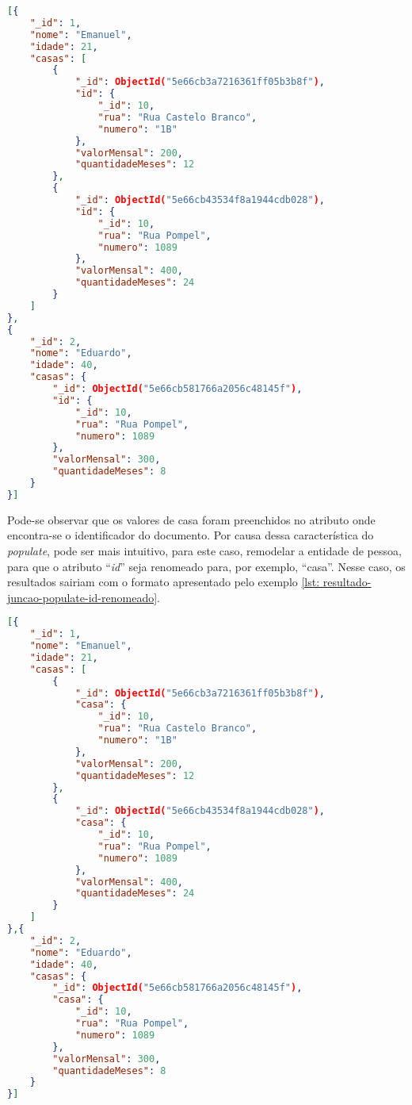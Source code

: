 \begin{lstlisting}[language=json, caption={Resultado da Junção de Documentos Com o \textit{Populate}\label{lst: resultado-juncao-populate}}]
[{
    "_id": 1,
    "nome": "Emanuel",
    "idade": 21,
    "casas": [
        {
            "_id": ObjectId("5e66cb3a7216361ff05b3b8f"),
            "id": {
                "_id": 10,
                "rua": "Rua Castelo Branco",
                "numero": "1B"
            },
            "valorMensal": 200,
            "quantidadeMeses": 12
        },
        {
            "_id": ObjectId("5e66cb43534f8a1944cdb028"),
            "id": {
                "_id": 10,
                "rua": "Rua Pompel",
                "numero": 1089
            },
            "valorMensal": 400,
            "quantidadeMeses": 24
        }
    ]
},
{
    "_id": 2,
    "nome": "Eduardo",
    "idade": 40,
    "casas": {
        "_id": ObjectId("5e66cb581766a2056c48145f"),
        "id": {
            "_id": 10,
            "rua": "Rua Pompel",
            "numero": 1089
        },
        "valorMensal": 300,
        "quantidadeMeses": 8
    }
}]
\end{lstlisting}

Pode-se observar que os valores de casa foram preenchidos no atributo onde encontra-se o identificador do documento. Por causa dessa característica do \textit{populate}, pode ser mais intuitivo, para este caso, remodelar a entidade de pessoa, para que o atributo ``\textit{id}'' seja renomeado para, por exemplo, ``casa''. Nesse caso, os resultados sairiam com o formato apresentado pelo exemplo \ref{lst: resultado-juncao-populate-id-renomeado}.

\begin{lstlisting}[language=json, caption={Resultado do \textit{Populate} com ``id'' Renomeado para ``casa''\label{lst: resultado-juncao-populate-id-renomeado}}]
[{
    "_id": 1,
    "nome": "Emanuel",
    "idade": 21,
    "casas": [
        {
            "_id": ObjectId("5e66cb3a7216361ff05b3b8f"),
            "casa": {
                "_id": 10,
                "rua": "Rua Castelo Branco",
                "numero": "1B"
            },
            "valorMensal": 200,
            "quantidadeMeses": 12
        },
        {
            "_id": ObjectId("5e66cb43534f8a1944cdb028"),
            "casa": {
                "_id": 10,
                "rua": "Rua Pompel",
                "numero": 1089
            },
            "valorMensal": 400,
            "quantidadeMeses": 24
        }
    ]
},{
    "_id": 2,
    "nome": "Eduardo",
    "idade": 40,
    "casas": {
        "_id": ObjectId("5e66cb581766a2056c48145f"),
        "casa": {
            "_id": 10,
            "rua": "Rua Pompel",
            "numero": 1089
        },
        "valorMensal": 300,
        "quantidadeMeses": 8
    }
}]
\end{lstlisting}

